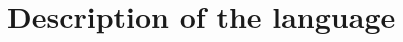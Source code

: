 \documentclass[twoside,a5paper]{algol60}
\begin{document}
\parindent 0pt %

   \par
   \par
\clearpage
\chapter*{Description of the language} %
  \par
	\par
	\par
	\par
	\par
	\par
	\par
	\par
	\par
\appendix
\clearpage
	\par  %
\clearpage
\renewcommand{\bibname}{References}
	\par

\vfill\eject





%
\printindex

\end{document}
